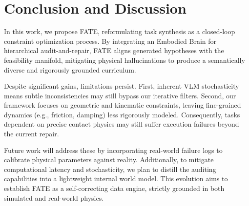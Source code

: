 \documentclass{article}
\theoremstyle{plain}
\theoremstyle{definition}
\theoremstyle{remark}
\begin{document}
\section{Conclusion and Discussion}
In this work, we propose FATE, reformulating task synthesis as a closed-loop constraint optimization process. By integrating an Embodied Brain for hierarchical audit-and-repair, FATE aligns generated hypotheses with the feasibility manifold, mitigating physical hallucinations to produce a semantically diverse and rigorously grounded curriculum.

Despite significant gains, limitations persist. First, inherent VLM stochasticity means subtle inconsistencies may still bypass our iterative filters. Second, our framework focuses on geometric and kinematic constraints, leaving fine-grained dynamics (e.g., friction, damping) less rigorously modeled. Consequently, tasks dependent on precise contact physics may still suffer execution failures beyond the current repair.

Future work will address these by incorporating real-world failure logs to calibrate physical parameters against reality. Additionally, to mitigate computational latency and stochasticity, we plan to distill the auditing capabilities into a lightweight internal world model. This evolution aims to establish FATE as a self-correcting data engine, strictly grounded in both simulated and real-world physics.




\end{document}
